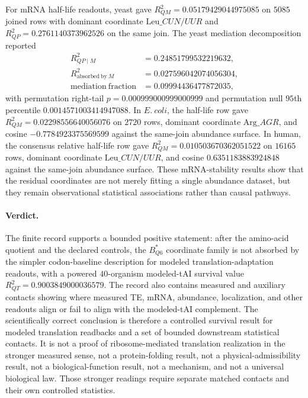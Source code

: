 For mRNA half-life readouts, yeast gave $R^2_{QM}=0.05179429044975085$ on $5085$ joined rows with dominant coordinate $\mathrm{Leu}\_{CUN/UUR}$ and $R^2_{QP}=0.2761140373962526$ on the same join.  The yeast mediation decomposition reported
$$
\begin{aligned}
R^2_{QP\mid M}&=0.24851799532219632,\\
R^2_{\mathrm{absorbed\ by}\ M}&=0.027596042074056304,\\
\mathrm{mediation\ fraction}&=0.09994436477872035,
\end{aligned}
$$
with permutation right-tail $p=0.000999000999000999$ and permutation null $95$th percentile $0.0014571003414947088$.  In $E.\ coli$, the half-life row gave $R^2_{QM}=0.02298556640056076$ on $2720$ rows, dominant coordinate $\mathrm{Arg}\_AGR$, and cosine $-0.7784923375569599$ against the same-join abundance surface.  In human, the consensus relative half-life row gave $R^2_{QM}=0.010503670362051522$ on $16165$ rows, dominant coordinate $\mathrm{Leu}\_{CUN/UUR}$, and cosine $0.6351183883924848$ against the same-join abundance surface.  These mRNA-stability results show that the residual coordinates are not merely fitting a single abundance dataset, but they remain observational statistical associations rather than causal pathways.

\paragraph{Verdict.}
The finite record supports a bounded positive statement: after the amino-acid quotient and the declared controls, the $B^*_{Q6}$ coordinate family is not absorbed by the simpler codon-baseline description for modeled translation-adaptation readouts, with a powered $40$-organism modeled-tAI survival value $R^2_{QT}=0.9003849000036579$.  The record also contains measured and auxiliary contacts showing where measured TE, mRNA, abundance, localization, and other readouts align or fail to align with the modeled-tAI complement.  The scientifically correct conclusion is therefore a controlled survival result for modeled translation readbacks and a set of bounded downstream statistical contacts.  It is not a proof of ribosome-mediated translation realization in the stronger measured sense, not a protein-folding result, not a physical-admissibility result, not a biological-function result, not a mechanism, and not a universal biological law.  Those stronger readings require separate matched contacts and their own controlled statistics.

